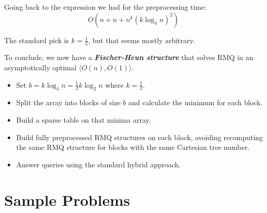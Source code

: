 \documentclass[11pt, oneside]{article}
\newcommand{\emphasis}[1]{\textbf{\textit{#1}}}
\begin{document}
Going back to the expression we had for the preprocessing time:
\[ O(n + n + n^k (k \log_4 n)^2) \]

The standard pick is \( k = \frac{1}{2} \), but that seems mostly arbitrary.

To conclude, we now have a \emphasis{Fischer-Heun structure} that solves RMQ
in an asymptotically optimal \( \langle O(n), O(1) \rangle \).

\begin{itemize}
  \item Set \( b = k \log_4 n = \frac{1}{2} k \log_2 n \) where \( k = \frac{1}{2} \).
  \item Split the array into blocks of size \( b \) and calculate the minimum for each block.
  \item Build a sparse table on that minima array.
  \item Build fully preprocessed RMQ structures on each block, avoiding recomputing the
  same RMQ structure for blocks with the same Cartesian tree number.
  \item Answer queries using the standard hybrid approach.
\end{itemize}

\section{Sample Problems}
\end{document}
